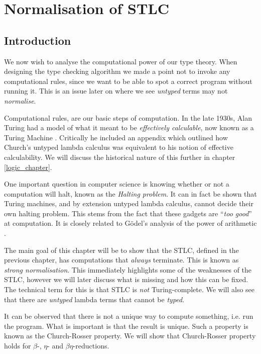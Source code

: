 \section{Normalisation of STLC}


\subsection{Introduction}
We now wish to analyse the computational power of our type theory.
When designing the type checking algorithm we made a point not to invoke any computational rules, since we want to be able to spot a correct program without running it. This is an issue later on where we see \emph{untyped} terms may not \emph{normalise}.

Computational rules, are our basic steps of computation. In the late 1930s, Alan Turing had a model of what it meant to be \emph{effectively calculable}, now known as a Turing Machine \cite{turing1936a}. Critically he included an appendix which outlined how Church's untyped lambda calculus was equivalent to his notion of effective calculability. We will discuss the historical nature of this further in chapter \ref{logic_chapter}.

One important question in computer science is knowing whether or not a computation will halt, known as the \emph{Halting problem}. It can in fact be shown that Turing machines, and by extension untyped lambda calculus, cannot decide their own halting problem. This stems from the fact that these gadgets are ``\emph{too good}'' at computation. It is closely related to G\"odel's analysis of the power of arithmetic \cite{GlossarWiki:Goedel:1931, godel1958}.

The main goal of this chapter will be to show that the STLC, defined in the previous chapter, has computations that \emph{always} terminate. This is known as \emph{strong normalisation}. This immediately highlights some of the weaknesses of the STLC, however we will later discuss what is missing and how this can be fixed. The technical term for this is that STLC is \emph{not} Turing-complete. \cite{} We will also see that there are \emph{untyped} lambda terms that cannot be \emph{typed}.

It can be observed that there is not a unique way to compute something, i.e. run the program. What is important is that the result is unique. Such a property is known as the Church-Rosser property. We will show that Church-Rosser property holds for $\beta$-, $\eta$- and $\beta\eta$-reductions. 

